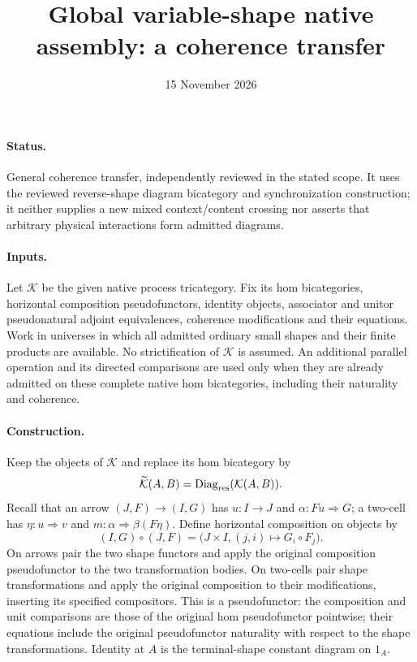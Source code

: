 \documentclass{article}
\title{Global variable-shape native assembly: a coherence transfer}
\date{15 November 2026}
\begin{document}
\maketitle
\paragraph{Status.} General coherence transfer, independently reviewed in the stated scope. It uses the reviewed reverse-shape diagram bicategory and synchronization construction; it neither supplies a new mixed context/content crossing nor asserts that arbitrary physical interactions form admitted diagrams.

\paragraph{Inputs.} Let $\mathcal K$ be the given native process tricategory. Fix its hom bicategories, horizontal composition pseudofunctors, identity objects, associator and unitor pseudonatural adjoint equivalences, coherence modifications and their equations. Work in universes in which all admitted ordinary small shapes and their finite products are available. No strictification of $\mathcal K$ is assumed. An additional parallel operation and its directed comparisons are used only when they are already admitted on these complete native hom bicategories, including their naturality and coherence.

\paragraph{Construction.} Keep the objects of $\mathcal K$ and replace its hom bicategory by
\[
 \widetilde{\mathcal K}(A,B)=\operatorname{Diag}_{\rm res}(\mathcal K(A,B)).
\]
Recall that an arrow $(J,F)\to(I,G)$ has $u:I\to J$ and $\alpha:Fu\Rightarrow G$; a two-cell has $\eta:u\Rightarrow v$ and $m:\alpha\Rightarrow\beta(F\eta)$. Define horizontal composition on objects by
\[
 (I,G)\circ(J,F)=\bigl(J\times I,(j,i)\mapsto G_i\circ F_j\bigr).
\]
On arrows pair the two shape functors and apply the original composition pseudofunctor to the two transformation bodies. On two-cells pair shape transformations and apply the original composition to their modifications, inserting its specified compositors. This is a pseudofunctor: the composition and unit comparisons are those of the original hom pseudofunctor pointwise; their equations include the original pseudofunctor naturality with respect to the shape transformations. Identity at $A$ is the terminal-shape constant diagram on $1_A$.
\end{document}
